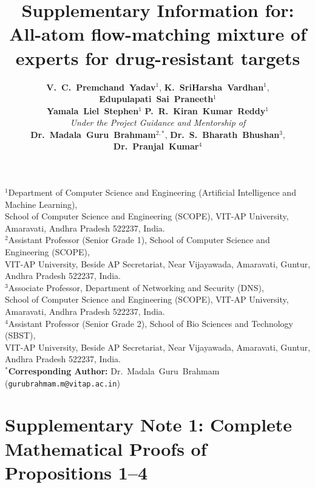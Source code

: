 \documentclass[11pt,a4paper]{article}
\title{\textbf{Supplementary Information for:\\All-atom flow-matching mixture of experts for drug-resistant targets}}
\author{
    \textbf{V.~C.~Premchand~Yadav}$^{1}$,\quad
    \textbf{K.~SriHarsha~Vardhan}$^{1}$,\quad
    \textbf{Edupulapati~Sai~Praneeth}$^{1}$\\[0.35em]
    \textbf{Yamala~Liel~Stephen}$^{1}$\quad\text{and}\quad
    \textbf{P.~R.~Kiran~Kumar~Reddy}$^{1}$\\[0.85em]
    \large\textit{Under the Project Guidance and Mentorship of}\\[0.45em]
    \textbf{Dr.~Madala~Guru~Brahmam}$^{2,*}$,\quad
    \textbf{Dr.~S.~Bharath~Bhushan}$^{3}$,\quad\text{and}\quad
    \textbf{Dr.~Pranjal~Kumar}$^{4}$
}
\date{}
\begin{document}
\maketitle

\begin{center}
\small
$^{1}$Department of Computer Science and Engineering (Artificial Intelligence and Machine Learning),\\
School of Computer Science and Engineering (SCOPE), VIT-AP University, Amaravati, Andhra Pradesh 522237, India.\\[0.35em]
$^{2}$Assistant Professor (Senior Grade 1), School of Computer Science and Engineering (SCOPE),\\
VIT-AP University, Beside AP Secretariat, Near Vijayawada, Amaravati, Guntur, Andhra Pradesh 522237, India.\\[0.35em]
$^{3}$Associate Professor, Department of Networking and Security (DNS),\\
School of Computer Science and Engineering (SCOPE), VIT-AP University, Amaravati, Andhra Pradesh 522237, India.\\[0.35em]
$^{4}$Assistant Professor (Senior Grade 2), School of Bio Sciences and Technology (SBST),\\
VIT-AP University, Beside AP Secretariat, Near Vijayawada, Amaravati, Guntur, Andhra Pradesh 522237, India.\\[0.6em]
$^{*}$\textbf{Corresponding Author:} Dr.~Madala~Guru~Brahmam (\texttt{gurubrahmam.m@vitap.ac.in})
\end{center}

\vspace{1em}

\tableofcontents

\newpage

\section*{Supplementary Note 1: Complete Mathematical Proofs of Propositions 1--4}
\end{document}
